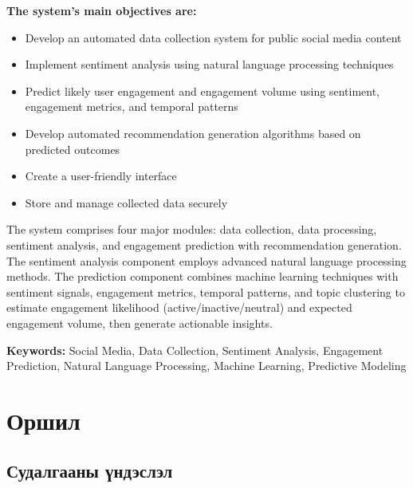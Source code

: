 \documentclass[12pt,a4paper]{report}
\begin{document}
\textbf{The system's main objectives are:}
\begin{itemize}
    \item Develop an automated data collection system for public social media content
    \item Implement sentiment analysis using natural language processing techniques
    \item Predict likely user engagement and engagement volume using sentiment, engagement metrics, and temporal patterns
    \item Develop automated recommendation generation algorithms based on predicted outcomes
    \item Create a user-friendly interface
    \item Store and manage collected data securely
\end{itemize}

The system comprises four major modules: data collection, data processing, sentiment analysis, and engagement prediction with recommendation generation. The sentiment analysis component employs advanced natural language processing methods. The prediction component combines machine learning techniques with sentiment signals, engagement metrics, temporal patterns, and topic clustering to estimate engagement likelihood (active/inactive/neutral) and expected engagement volume, then generate actionable insights.

\textbf{Keywords:} Social Media, Data Collection, Sentiment Analysis, Engagement Prediction, Natural Language Processing, Machine Learning, Predictive Modeling

\tableofcontents
\clearpage
\listoftables
\clearpage
\listoffigures
\clearpage
{}

\chapter{Оршил}

\section{Судалгааны үндэслэл}
\end{document}
